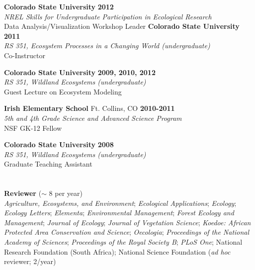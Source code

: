 \documentclass[margin,line]{resume}
\begin{document}
\begin{resume}
    \textbf{Colorado State University} \hfill \textbf{2012}\\ 
               \textsl{NREL Skills for Undergraduate Participation in Ecological Research}\\
               Data Analysis/Visualization Workshop Leader
               		      \newpage{}
    \textbf{Colorado State University} \hfill \textbf{2011}\\ 
               \textsl{RS 351, Ecosystem Processes in a Changing World (undergraduate)}\\
               Co-Instructor 

    \textbf{Colorado State University} \hfill \textbf{2009, 2010, 2012}\\ 
               \textsl{RS 351, Wildland Ecosystems (undergraduate)}\\
               Guest Lecture on Ecosystem Modeling
               
    \textbf{Irish Elementary School} Ft. Collins, CO \hfill \textbf{2010-2011}\\ 
   		\textsl{5th and 4th Grade Science and Advanced Science Program}\\
		NSF GK-12 Fellow
		
     \textbf{Colorado State University} \hfill \textbf{2008}\\ 
               \textsl{RS 351, Wildland Ecosystems (undergraduate)}\\
               Graduate Teaching Assistant 
     \section{\textmd{\textsf{\color{MidnightBlue}{Professional\\Service}}}}
    \textbf{Reviewer} ($\sim$ 8 per year)\\
    \textsl{Agriculture, Ecosystems, and Environment};
    \textsl{Ecological Applications};
    \textsl{Ecology};
    \textsl{Ecology Letters};
    \textsl{Elementa};
    \textsl{Environmental Management};
    \textsl{Forest Ecology and Management};
    \textsl{Journal of Ecology};
    \textsl{Journal of Vegetation Science};
    \textsl{Koedoe: African Protected Area Conservation and Science};
    \textsl{Oecologia};
    \textsl{Proceedings of the National Academy of Sciences};
    \textsl{Proceedings of the Royal Society B};
     \textsl{PLoS One};
     National Research Foundation (South Africa);
     National Science Foundation (\emph{ad hoc} reviewer; 2/year)
	


\end{resume}
\end{document}
